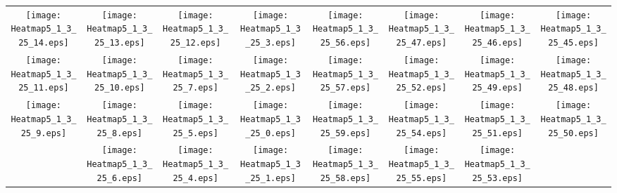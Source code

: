 \documentclass{standalone}
\begin{document}
\begin{tabular}{ *8{c} }
\texttt{[image: Heatmap5\_1\_3\_25\_14.eps]} & \texttt{[image: Heatmap5\_1\_3\_25\_13.eps]} & \texttt{[image: Heatmap5\_1\_3\_25\_12.eps]} & \texttt{[image: Heatmap5\_1\_3\_25\_3.eps]} & \texttt{[image: Heatmap5\_1\_3\_25\_56.eps]} & \texttt{[image: Heatmap5\_1\_3\_25\_47.eps]} & \texttt{[image: Heatmap5\_1\_3\_25\_46.eps]} & \texttt{[image: Heatmap5\_1\_3\_25\_45.eps]} \\
\texttt{[image: Heatmap5\_1\_3\_25\_11.eps]} & \texttt{[image: Heatmap5\_1\_3\_25\_10.eps]} & \texttt{[image: Heatmap5\_1\_3\_25\_7.eps]} & \texttt{[image: Heatmap5\_1\_3\_25\_2.eps]} & \texttt{[image: Heatmap5\_1\_3\_25\_57.eps]} & \texttt{[image: Heatmap5\_1\_3\_25\_52.eps]} & \texttt{[image: Heatmap5\_1\_3\_25\_49.eps]} & \texttt{[image: Heatmap5\_1\_3\_25\_48.eps]} \\
\texttt{[image: Heatmap5\_1\_3\_25\_9.eps]} & \texttt{[image: Heatmap5\_1\_3\_25\_8.eps]} & \texttt{[image: Heatmap5\_1\_3\_25\_5.eps]} & \texttt{[image: Heatmap5\_1\_3\_25\_0.eps]} & \texttt{[image: Heatmap5\_1\_3\_25\_59.eps]} & \texttt{[image: Heatmap5\_1\_3\_25\_54.eps]} & \texttt{[image: Heatmap5\_1\_3\_25\_51.eps]} & \texttt{[image: Heatmap5\_1\_3\_25\_50.eps]} \\
 & \texttt{[image: Heatmap5\_1\_3\_25\_6.eps]} & \texttt{[image: Heatmap5\_1\_3\_25\_4.eps]} & \texttt{[image: Heatmap5\_1\_3\_25\_1.eps]} & \texttt{[image: Heatmap5\_1\_3\_25\_58.eps]} & \texttt{[image: Heatmap5\_1\_3\_25\_55.eps]} & \texttt{[image: Heatmap5\_1\_3\_25\_53.eps]} &  
\end{tabular}
\end{document}

